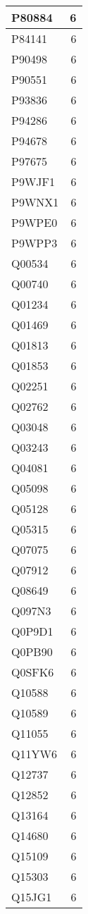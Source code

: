 \documentclass[
]{book}
\theoremstyle{definition}
\theoremstyle{definition}
\theoremstyle{definition}
\theoremstyle{definition}
\theoremstyle{remark}
\begin{document}
\begin{table}
\begin{tabular}{l|r}
\hline
P80884 & 6\\
\hline
P84141 & 6\\
\hline
P90498 & 6\\
\hline
P90551 & 6\\
\hline
P93836 & 6\\
\hline
P94286 & 6\\
\hline
P94678 & 6\\
\hline
P97675 & 6\\
\hline
P9WJF1 & 6\\
\hline
P9WNX1 & 6\\
\hline
P9WPE0 & 6\\
\hline
P9WPP3 & 6\\
\hline
Q00534 & 6\\
\hline
Q00740 & 6\\
\hline
Q01234 & 6\\
\hline
Q01469 & 6\\
\hline
Q01813 & 6\\
\hline
Q01853 & 6\\
\hline
Q02251 & 6\\
\hline
Q02762 & 6\\
\hline
Q03048 & 6\\
\hline
Q03243 & 6\\
\hline
Q04081 & 6\\
\hline
Q05098 & 6\\
\hline
Q05128 & 6\\
\hline
Q05315 & 6\\
\hline
Q07075 & 6\\
\hline
Q07912 & 6\\
\hline
Q08649 & 6\\
\hline
Q097N3 & 6\\
\hline
Q0P9D1 & 6\\
\hline
Q0PB90 & 6\\
\hline
Q0SFK6 & 6\\
\hline
Q10588 & 6\\
\hline
Q10589 & 6\\
\hline
Q11055 & 6\\
\hline
Q11YW6 & 6\\
\hline
Q12737 & 6\\
\hline
Q12852 & 6\\
\hline
Q13164 & 6\\
\hline
Q14680 & 6\\
\hline
Q15109 & 6\\
\hline
Q15303 & 6\\
\hline
Q15JG1 & 6\\

\end{tabular}
\end{table}
\end{document}

